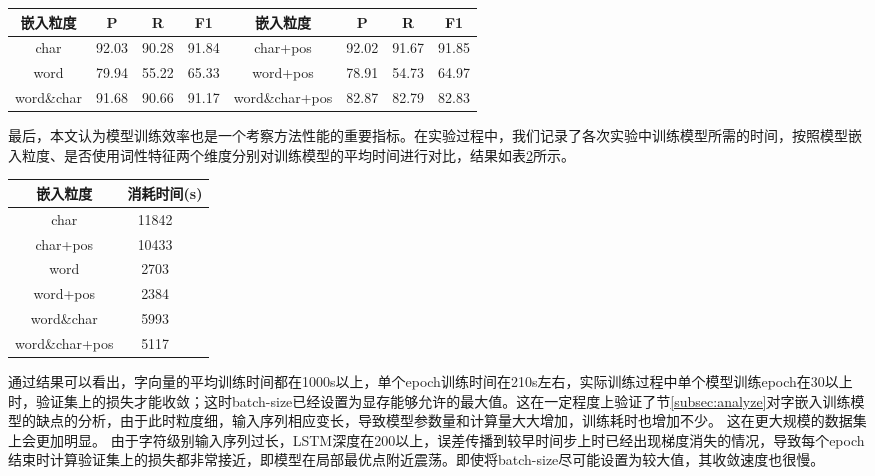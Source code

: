 \begin{table}[H]
    \centering
    \begin{tabular}{cccccccc}
        \toprule
        嵌入粒度 & P  & R  & F1 & 嵌入粒度 & P & R & F1\\
        \midrule
        char & 92.03 & 90.28 & 91.84 & char+pos & 92.02 &  91.67 & 91.85\\
        word & 79.94 & 55.22 & 65.33 & word+pos & 78.91 & 54.73 & 64.97\\
        word\&char & 91.68 & 90.66 & 91.17 & word\&char+pos & 82.87 & 82.79 & 82.83\\
        \bottomrule
    \end{tabular}
    \label{tab:overall_comparison}
\end{table}


最后，本文认为模型训练效率也是一个考察方法性能的重要指标。在实验过程中，我们记录了各次实验中训练模型所需的时间，按照模型嵌入粒度、是否使用词性特征两个维度分别对训练模型的平均时间进行对比，结果如表\ref{tab:train_time}所示。

\begin{table}[H]
    \centering
    \begin{tabular}{ccc}
        \toprule
        嵌入粒度 & \multicolumn{2}{c}{消耗时间(s)}\\
        \midrule
        char  & 11842\\
        char+pos & 10433\\
        word  & 2703 \\
        word+pos  & 2384\\
        word\&char  & 5993\\
        word\&char+pos  & 5117 \\
        \bottomrule
    \end{tabular}
    \label{tab:train_time}
\end{table}

通过结果可以看出，字向量的平均训练时间都在1000s以上，单个epoch训练时间在210s左右，实际训练过程中单个模型训练epoch在30以上时，验证集上的损失才能收敛；这时batch-size已经设置为显存能够允许的最大值。这在一定程度上验证了节\ref{subsec:analyze}对字嵌入训练模型的缺点的分析，由于此时粒度细，输入序列相应变长，导致模型参数量和计算量大大增加，训练耗时也增加不少。
这在更大规模的数据集上会更加明显。
由于字符级别输入序列过长，LSTM深度在200以上，误差传播到较早时间步上时已经出现梯度消失的情况，导致每个epoch结束时计算验证集上的损失都非常接近，即模型在局部最优点附近震荡。即使将batch-size尽可能设置为较大值，其收敛速度也很慢。

